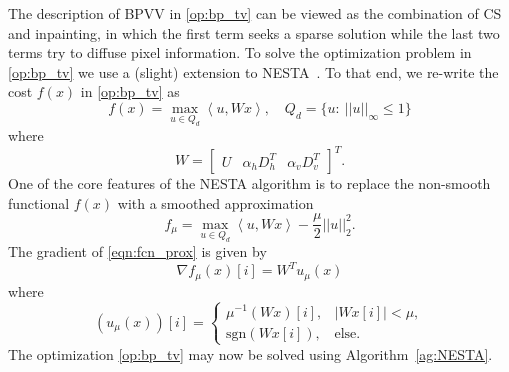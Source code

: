 \documentclass[twocolumn,oneside]{IEEEtran/IEEEtran}
\begin{document}
The description of BPVV in \eqref{op:bp_tv} can be viewed as the combination of CS
and inpainting, in which the first term seeks a sparse solution while the
last two terms try to diffuse pixel information.
To solve the optimization problem in \eqref{op:bp_tv} we use a (slight) extension to NESTA~\cite{becker_nesta_2011}. To that end, we re-write the cost $f(x)$ in \eqref{op:bp_tv} as
\begin{equation*}
  f(x) = \max_{u\in Q_d} \left\langle u, Wx \right\rangle,\quad Q_d = \{u:~||u||_{\infty} \leq 1\}
\end{equation*}
where
\begin{equation*}
W = \begin{bmatrix}U&\alpha_hD^T_h&\alpha_vD^T_v \end{bmatrix}^T.
\end{equation*}
One of the core features of the NESTA algorithm is to replace the non-smooth functional $f(x)$ with a smoothed approximation
\begin{equation}
  f_{\mu} = \max_{u\in Q_d} \left\langle u,
    W x \right\rangle - \frac{\mu}{2}||u||_2^2. \label{eqn:fcn_prox}
\end{equation}
The gradient of \eqref{eqn:fcn_prox} is given by
\begin{equation*}
  \nabla f_{\mu}(x)[i] = W^Tu_{\mu}(x)
\end{equation*}
where
\begin{equation*}
  (u_{\mu}(x))[i] = 
\begin{cases}
    \mu^{-1}(Wx)[i], & |W x[i]| < \mu,\\
    \text{sgn}(W x[i]), & \text{else}.
  \end{cases}
\end{equation*}
The optimization \eqref{op:bp_tv} may now be solved using Algorithm~\ref{ag:NESTA}.
\end{document}
